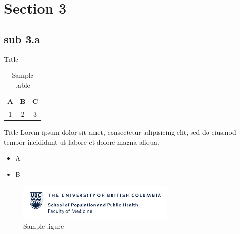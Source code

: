 \documentclass[aspectratio=43]{beamer}
\begin{document}
	
	\section{Section 3}
	\subsection{sub 3.a}
	
	\begin{frame}{Title}
		\begin{table}
			\centering
			\caption{Sample table}
			\begin{tabular}{c|c|c}
				A & B & C\\
				\hline
				1 & 2 & 3
			\end{tabular}
		\end{table}
	\end{frame}
	
	\begin{frame}{Title}
		Lorem ipsum dolor sit amet, consectetur adipisicing elit, sed do eiusmod tempor incididunt ut labore et dolore magna aliqua.
		\begin{itemize}
			\item A
			\item B
		\end{itemize}		
		\begin{figure}
			\centering			
			\includegraphics[width=0.7\textwidth]{logos/spph_logo_full_blue.png}
			\caption{Sample figure}
		\end{figure}
	\end{frame}
	
	
\end{document}
